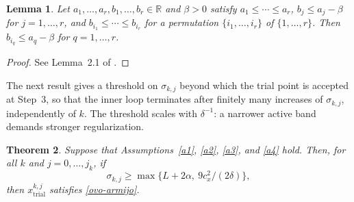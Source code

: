 \documentclass[11pt]{article}
\newcommand{\xkjtrial}{x^{k,j}_{\mathrm{trial}}}
\newtheorem{theorem}{Theorem}[section]
\newtheorem{lemma}[theorem]{Lemma}
\begin{document}
\begin{lemma} \label{lem1}
Let $a_1, \ldots, a_r, b_1, \ldots, b_r \in \mathbb{R}$ and $\beta > 0$ satisfy
$a_1 \leq \cdots \leq a_r$, $b_j \leq a_j - \beta$ for $j = 1, \ldots, r$, and
$b_{i_1} \leq \cdots \leq b_{i_r}$ for a permutation $\{i_1, \ldots, i_r\}$ of
$\{1, \ldots, r\}$. Then $b_{i_q} \leq a_q - \beta$ for $q = 1, \ldots, r$.
\end{lemma}

\begin{proof}
See Lemma~2.1 of \cite{dunder1}.
\end{proof}

The next result gives a threshold on $\sigma_{k,j}$ beyond which the trial point
is accepted at Step~3, so that the inner loop terminates after finitely many
increases of $\sigma_{k,j}$, independently of $k$. The threshold scales with
$\delta^{-1}$: a narrower active band demands stronger regularization.

\begin{theorem} \label{teo:suff-descent}
Suppose that Assumptions~\ref{a1}, \ref{a2}, \ref{a3}, and \ref{a4} hold. Then,
for all $k$ and $j = 0, \ldots, j_k$, if
\begin{equation} \label{este}
\sigma_{k,j} \geq \max\{ L + 2\alpha,\ 9c_x^2/(2\delta) \},
\end{equation}
then $\xkjtrial$ satisfies \eqref{ovo-armijo}.
\end{theorem}
\end{document}
